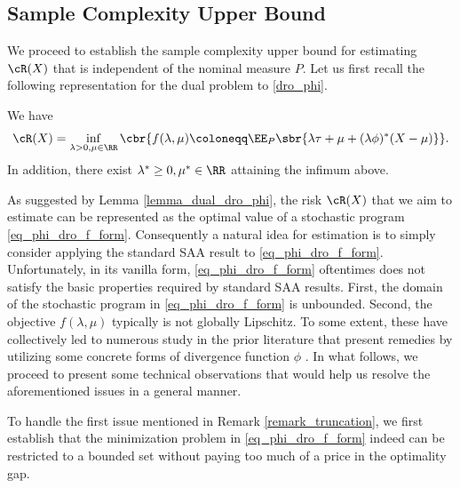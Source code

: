 \documentclass[9pt]{article} %
\numberwithin{equation}{section}
\begin{document}
\subsection{Sample Complexity Upper Bound}\label{subsec_sample_ub}
We proceed to establish the sample complexity upper bound for estimating $\cR(X)$ that is independent of the nominal measure $P$.
Let us first recall the following representation for the dual problem to \eqref{dro_phi}.

\begin{lemma}\label{lemma_dual_dro_phi}
We have 
\begin{align}\label{eq_phi_dro_f_form}
    \cR(X) = \inf_{\lambda > 0, \mu \in \RR}
    \cbr{f(\lambda, \mu) \coloneqq   
    \EE_P \sbr{ \lambda \tau + \mu + (\lambda \phi)^* (X - \mu) } }.
\end{align}
In addition, there exist $\lambda^* \geq 0, \mu^* \in \RR$ attaining the infimum above.
\end{lemma}


\begin{remark}\label{remark_truncation}
As suggested by Lemma \ref{lemma_dual_dro_phi}, the risk $\cR(X)$ that we aim to estimate can be represented as the optimal value of a stochastic program \eqref{eq_phi_dro_f_form}.
Consequently a natural idea for estimation is to simply consider applying the standard SAA result  \cite{shapiro2021lectures} to \eqref{eq_phi_dro_f_form}.
Unfortunately, in its vanilla form, \eqref{eq_phi_dro_f_form} oftentimes does not satisfy the basic properties required by standard SAA results.
First, the domain of the stochastic program in \eqref{eq_phi_dro_f_form} is unbounded.
Second, the objective  $f(\lambda, \mu)$ typically is not globally Lipschitz.
To some extent, these have collectively  led to numerous study in the prior literature that present remedies by utilizing some concrete forms of divergence function $\phi$ \cite{duchi2021learning,levy2020large,xu2023improved, shi2024distributionally,wang2024sample}. 
In what follows, we proceed to present some technical observations that would help us resolve the aforementioned issues in a general manner. 
\end{remark}

To handle the first issue mentioned in Remark \ref{remark_truncation}, we first establish that the minimization problem in \eqref{eq_phi_dro_f_form} indeed can be restricted to a bounded set without paying too much of a price in the optimality gap. 
\end{document}
